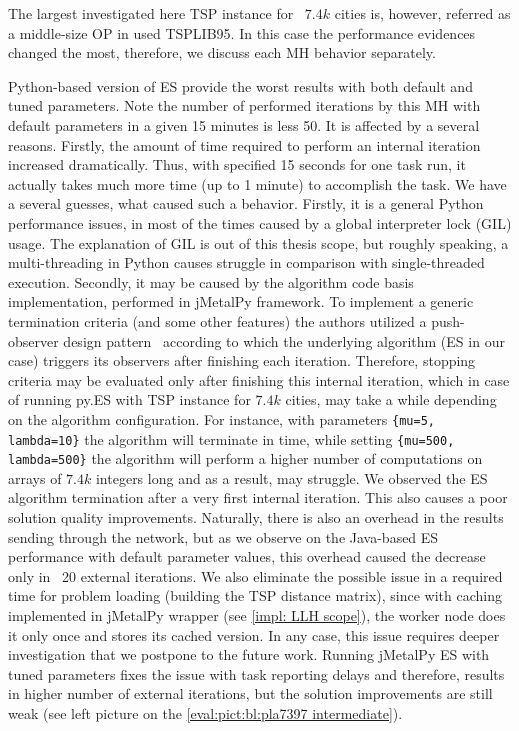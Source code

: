 The largest investigated here TSP instance for ~$7.4k$ cities is, however, referred as a middle-size OP in used TSPLIB95. In this case the performance evidences changed the most, therefore, we discuss each MH behavior separately.

Python-based version of ES provide the worst results with both default and tuned parameters. Note the number of performed iterations by this MH with default parameters in a given 15 minutes is less 50. It is affected by a several reasons. Firstly, the amount of time required to perform an internal iteration increased dramatically. Thus, with specified 15 seconds for one task run, it actually takes much more time (up to 1 minute) to accomplish the task. We have a several guesses, what caused such a behavior. Firstly, it is a general Python performance issues, in most of the times caused by a global interpreter lock (GIL) usage. The explanation of GIL is out of this thesis scope, but roughly speaking, a multi-threading in Python causes struggle in comparison with single-threaded execution. Secondly, it may be caused by the algorithm code basis implementation, performed in jMetalPy framework. To implement a generic termination criteria (and some other features) the authors utilized a push-observer design pattern~\cite{benitez2019jmetalpy} according to which the underlying algorithm (ES in our case) triggers its observers after finishing each iteration. Therefore, stopping criteria may be evaluated only after finishing this internal iteration, which in case of running py.ES with TSP instance for $7.4k$ cities, may take a while depending on the algorithm configuration. For instance, with parameters \texttt{\{mu=5, lambda=10\}} the algorithm will terminate in time, while setting \texttt{\{mu=500, lambda=500\}} the algorithm will perform a higher number of computations on arrays of $7.4k$ integers long and as a result, may struggle. We observed the ES algorithm termination after a very first internal iteration. This also causes a poor solution quality improvements. Naturally, there is also an overhead in the results sending through the network, but as we observe on the Java-based ES performance with default parameter values, this overhead caused the decrease only in ~20 external iterations. We also eliminate the possible issue in a required time for problem loading (building the TSP distance matrix), since with caching implemented in jMetalPy wrapper (see \cref{impl: LLH scope}), the worker node does it only once and stores its cached version. In any case, this issue requires deeper investigation that we postpone to the future work. Running jMetalPy ES with tuned parameters fixes the issue with task reporting delays and therefore, results in higher number of external iterations, but the solution improvements are still weak (see left picture on the \cref{eval:pict:bl:pla7397 intermediate}).

